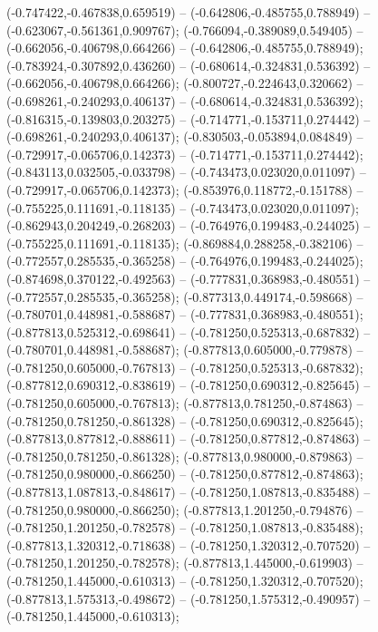  (-0.747422,-0.467838,0.659519) -- (-0.642806,-0.485755,0.788949) -- (-0.623067,-0.561361,0.909767);
 (-0.766094,-0.389089,0.549405) -- (-0.662056,-0.406798,0.664266) -- (-0.642806,-0.485755,0.788949);
 (-0.783924,-0.307892,0.436260) -- (-0.680614,-0.324831,0.536392) -- (-0.662056,-0.406798,0.664266);
 (-0.800727,-0.224643,0.320662) -- (-0.698261,-0.240293,0.406137) -- (-0.680614,-0.324831,0.536392);
 (-0.816315,-0.139803,0.203275) -- (-0.714771,-0.153711,0.274442) -- (-0.698261,-0.240293,0.406137);
 (-0.830503,-0.053894,0.084849) -- (-0.729917,-0.065706,0.142373) -- (-0.714771,-0.153711,0.274442);
 (-0.843113,0.032505,-0.033798) -- (-0.743473,0.023020,0.011097) -- (-0.729917,-0.065706,0.142373);
 (-0.853976,0.118772,-0.151788) -- (-0.755225,0.111691,-0.118135) -- (-0.743473,0.023020,0.011097);
 (-0.862943,0.204249,-0.268203) -- (-0.764976,0.199483,-0.244025) -- (-0.755225,0.111691,-0.118135);
 (-0.869884,0.288258,-0.382106) -- (-0.772557,0.285535,-0.365258) -- (-0.764976,0.199483,-0.244025);
 (-0.874698,0.370122,-0.492563) -- (-0.777831,0.368983,-0.480551) -- (-0.772557,0.285535,-0.365258);
 (-0.877313,0.449174,-0.598668) -- (-0.780701,0.448981,-0.588687) -- (-0.777831,0.368983,-0.480551);
 (-0.877813,0.525312,-0.698641) -- (-0.781250,0.525313,-0.687832) -- (-0.780701,0.448981,-0.588687);
 (-0.877813,0.605000,-0.779878) -- (-0.781250,0.605000,-0.767813) -- (-0.781250,0.525313,-0.687832);
 (-0.877812,0.690312,-0.838619) -- (-0.781250,0.690312,-0.825645) -- (-0.781250,0.605000,-0.767813);
 (-0.877813,0.781250,-0.874863) -- (-0.781250,0.781250,-0.861328) -- (-0.781250,0.690312,-0.825645);
 (-0.877813,0.877812,-0.888611) -- (-0.781250,0.877812,-0.874863) -- (-0.781250,0.781250,-0.861328);
 (-0.877813,0.980000,-0.879863) -- (-0.781250,0.980000,-0.866250) -- (-0.781250,0.877812,-0.874863);
 (-0.877813,1.087813,-0.848617) -- (-0.781250,1.087813,-0.835488) -- (-0.781250,0.980000,-0.866250);
 (-0.877813,1.201250,-0.794876) -- (-0.781250,1.201250,-0.782578) -- (-0.781250,1.087813,-0.835488);
 (-0.877813,1.320312,-0.718638) -- (-0.781250,1.320312,-0.707520) -- (-0.781250,1.201250,-0.782578);
 (-0.877813,1.445000,-0.619903) -- (-0.781250,1.445000,-0.610313) -- (-0.781250,1.320312,-0.707520);
 (-0.877813,1.575313,-0.498672) -- (-0.781250,1.575312,-0.490957) -- (-0.781250,1.445000,-0.610313);
